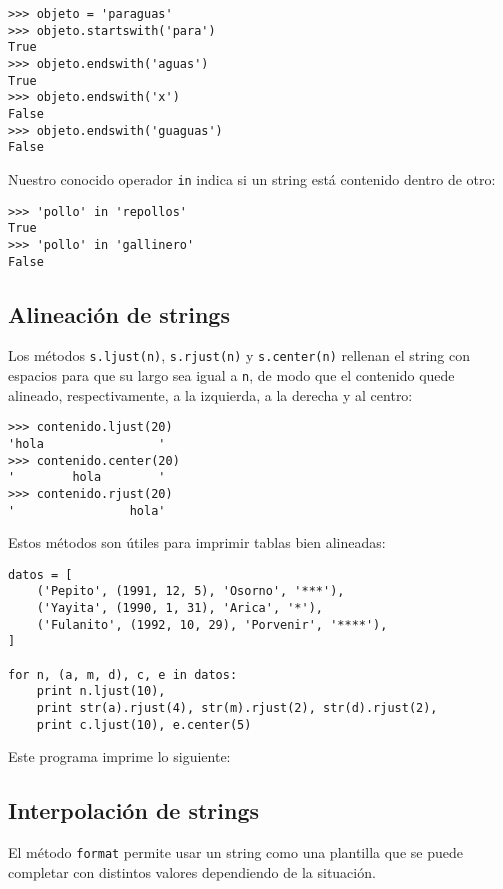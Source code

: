 \begin{lstlisting}
>>> objeto = 'paraguas'
>>> objeto.startswith('para')
True
>>> objeto.endswith('aguas')
True
>>> objeto.endswith('x')
False
>>> objeto.endswith('guaguas')
False
\end{lstlisting}

Nuestro conocido operador \lstinline!in! indica si un string está
contenido dentro de otro:

\begin{lstlisting}
>>> 'pollo' in 'repollos'
True
>>> 'pollo' in 'gallinero'
False
\end{lstlisting}

\subsection{Alineación de strings}

Los métodos \lstinline!s.ljust(n)!, \lstinline!s.rjust(n)! y
\lstinline!s.center(n)! rellenan el string con espacios para que su
largo sea igual a \lstinline!n!, de modo que el contenido quede
alineado, respectivamente, a la izquierda, a la derecha y al centro:

\begin{lstlisting}
>>> contenido.ljust(20)
'hola                '
>>> contenido.center(20)
'        hola        '
>>> contenido.rjust(20)
'                hola'
\end{lstlisting}

Estos métodos son útiles para imprimir tablas bien alineadas:

\begin{lstlisting}
datos = [
    ('Pepito', (1991, 12, 5), 'Osorno', '***'),
    ('Yayita', (1990, 1, 31), 'Arica', '*'),
    ('Fulanito', (1992, 10, 29), 'Porvenir', '****'),
]

for n, (a, m, d), c, e in datos:
    print n.ljust(10),
    print str(a).rjust(4), str(m).rjust(2), str(d).rjust(2),
    print c.ljust(10), e.center(5)
\end{lstlisting}

Este programa imprime lo siguiente:

\subsection{Interpolación de strings}

El método \lstinline!format! permite usar un string como una plantilla
que se puede completar con distintos valores dependiendo de la
situación.

